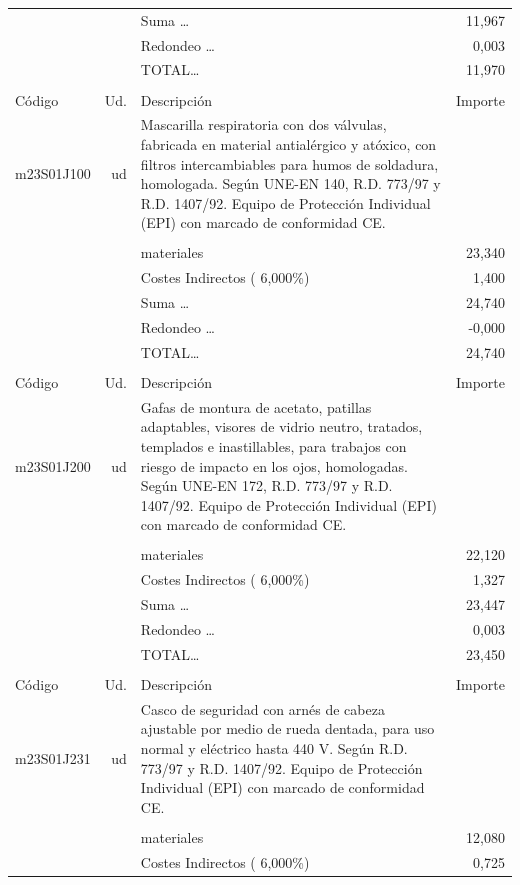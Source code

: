 \begin{supertabular}{l r p{60mm} r}
&&Suma \ldots&    11,967\\%
&&Redondeo \ldots&     0,003\\%
%
&&TOTAL\ldots&    11,970\\%
&&&\\%
Código&Ud.&Descripción&Importe\\%
\hline%
m23S01J100&ud&Mascarilla respiratoria con dos válvulas, fabricada en material antialérgico y atóxico, con filtros intercambiables para humos de soldadura, homologada. Según UNE{-}EN 140, R.D. 773/97 y R.D. 1407/92. Equipo de Protección Individual (EPI) con marcado de conformidad CE.&\\%
&&&\\%
&&materiales&    23,340\\%
&&Costes Indirectos (     6,000\%)&     1,400\\%
&&Suma \ldots&    24,740\\%
&&Redondeo \ldots&    {-}0,000\\%
%
&&TOTAL\ldots&    24,740\\%
&&&\\%
Código&Ud.&Descripción&Importe\\%
\hline%
m23S01J200&ud&Gafas de montura de acetato, patillas adaptables, visores de vidrio neutro, tratados, templados e inastillables, para trabajos con riesgo de impacto en los ojos, homologadas. Según UNE{-}EN 172, R.D. 773/97 y R.D. 1407/92. Equipo de Protección Individual (EPI) con marcado de conformidad CE.&\\%
&&&\\%
&&materiales&    22,120\\%
&&Costes Indirectos (     6,000\%)&     1,327\\%
&&Suma \ldots&    23,447\\%
&&Redondeo \ldots&     0,003\\%
%
&&TOTAL\ldots&    23,450\\%
&&&\\%
Código&Ud.&Descripción&Importe\\%
\hline%
m23S01J231&ud&Casco de seguridad con arnés de cabeza ajustable por medio de rueda dentada, para uso normal y eléctrico hasta 440 V. Según R.D. 773/97 y R.D. 1407/92. Equipo de Protección Individual (EPI) con marcado de conformidad CE.&\\%
&&&\\%
&&materiales&    12,080\\%
&&Costes Indirectos (     6,000\%)&     0,725\\%

\end{supertabular}
